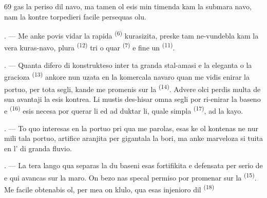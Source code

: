 \begin{VUpage}[71]{69}
\VUcontinue
gas la periso dil navo, ma tamen ol esis min\nl
timenda kam la submara navo, nam la kontre\cc
torpedieri facile persequas olu.

. --- Me anke povis vidar la rapida \cc
{} \textsuperscript{(6)} kurasizita, preske tam ne-vundebla kam\nl
la vera kuras-navo, plura  \textsuperscript{(12)}\nl
tri o quar  \textsuperscript{(7)} e fine un  \textsuperscript{(11)}.\nl
{}\nl
{}

. --- Quanta difero di konstrukteso inter\nl
ta granda stal-amasi e la eleganta  o la\nl
gracioza  \textsuperscript{(13)} ankore nun uzata en\nl
la komercala navaro quan me vidis enirar la\nl
portuo, per tota segli, kande me promenis sur\nl
la  \textsuperscript{(14)}. Advere olci perdis multa de sua\nl
avantaji  la  esis kontrea. Li mustis\nl
des-hisar omna segli por ri-enirar la baseno e\nl
{} \textsuperscript{(16)} esis necesa por querar li ed ad\cc
duktar li, quale simpla  \textsuperscript{(17)}, ad la\nl
kayo.

\VUsaut{3.0mm}
\VUsaut{3.0mm}

. --- To quo interesas en la portuo pri qua\nl
me parolas, esas ke ol kontenas ne nur mili\cc
tala portuo, artifice aranjita per gigantala la\cc
bori, ma anke marveloza  si\cc
tuita en l' di granda fluvio.

. --- La tera lango qua separas la du baseni\nl
esas fortifikita e defensata per serio de \nl
e  qui avancas sur la maro. On bezo\cc
nas specal permiso por promenar sur la \cc
{} \textsuperscript{(15)}. Me facile obtenabis ol, per mea on\cc
klulo, qua esas injenioro dil  \textsuperscript{(18)}
\parplein
\end{VUpage}

